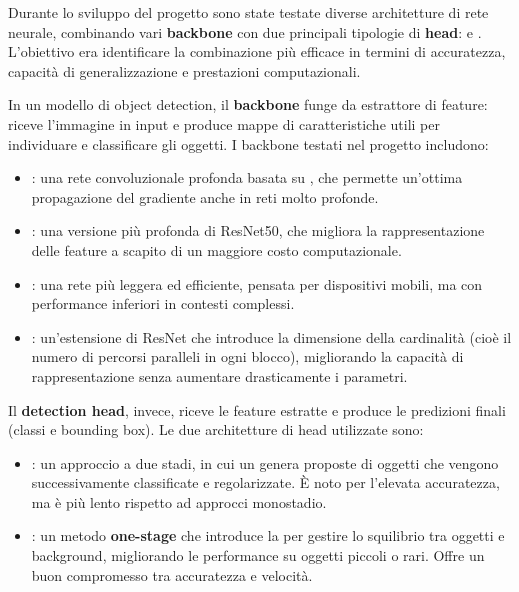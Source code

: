 \documentclass[minted, draw]{../tex/hebdomon}
\begin{document}

Durante lo sviluppo del progetto sono state testate diverse architetture di rete neurale, combinando vari \textbf{backbone} con due principali tipologie di \textbf{head}:  e . L’obiettivo era identificare la combinazione più efficace in termini di accuratezza, capacità di generalizzazione e prestazioni computazionali.

In un modello di object detection, il \textbf{backbone} funge da estrattore di feature: riceve l’immagine in input e produce mappe di caratteristiche utili per individuare e classificare gli oggetti. I backbone testati nel progetto includono:

\begin{itemize}
	\item {}: una rete convoluzionale profonda basata su , che permette un’ottima propagazione del gradiente anche in reti molto profonde.
	\item {}: una versione più profonda di ResNet50, che migliora la rappresentazione delle feature a scapito di un maggiore costo computazionale.
	\item {}: una rete più leggera ed efficiente, pensata per dispositivi mobili, ma con performance inferiori in contesti complessi. 
	\item {}: un’estensione di ResNet che introduce la dimensione della cardinalità (cioè il numero di percorsi paralleli in ogni blocco), migliorando la capacità di rappresentazione senza aumentare drasticamente i parametri.
\end{itemize}


Il \textbf{detection head}, invece, riceve le feature estratte e produce le predizioni finali (classi e bounding box). Le due architetture di head utilizzate sono:

\begin{itemize}
	\item {}: un approccio a due stadi, in cui un  genera proposte di oggetti che vengono successivamente classificate e regolarizzate. È noto per l’elevata accuratezza, ma è più lento rispetto ad approcci monostadio.
	\item {}: un metodo \textbf{one-stage} che introduce la  per gestire lo squilibrio tra oggetti e background, migliorando le performance su oggetti piccoli o rari. Offre un buon compromesso tra accuratezza e velocità.
\end{itemize}
\end{document}
